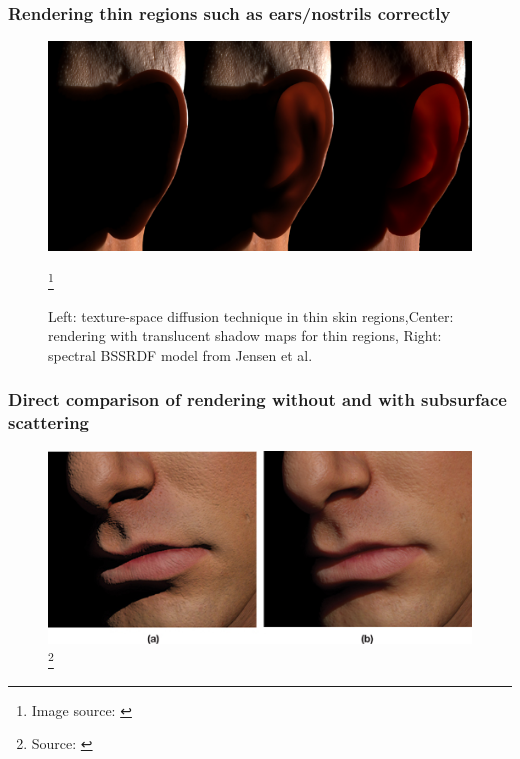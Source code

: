 \documentclass{f4_beamer_metropolis}
\newcommand\blfootnote[1]{%
  \begingroup
  \renewcommand\thefootnote{}\footnote{#1}%
  \addtocounter{footnote}{-1}%
  \endgroup
}
\begin{document}
\begin{frame}[t]
  \frametitle{Rendering thin regions such as ears/nostrils correctly}
  \begin{figure}
    \includegraphics[scale=0.2,keepaspectratio]{./images/translucent-shadow-maps.jpg}
    \caption{
      Left: texture-space diffusion technique in thin skin regions,Center: rendering with translucent shadow maps for thin regions, Right: spectral BSSRDF model from Jensen et al.
    }
    \blfootnote{Image source: \citep{efficient-human-skin-rendering}}
  \end{figure}

\end{frame}

\begin{frame}[t]
  \frametitle{Direct comparison of rendering without and with subsurface scattering}
  \begin{figure}[!h]
    \centering
    \includegraphics[scale=0.9,keepaspectratio]{./images/skin-rendering-with-without-sss.jpg}
    \blfootnote{Source: \citet{efficient-human-skin-rendering}}
  \end{figure}

\end{frame}
\end{document}
